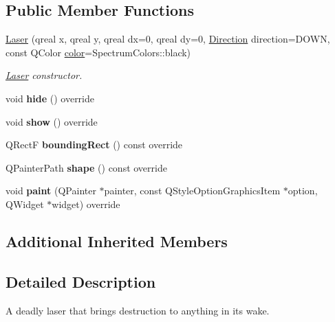 \subsection*{Public Member Functions}
\begin{DoxyCompactItemize}
\item 
\hyperlink{class_laser_a30b4f582099e3224f2735cd48e57a4c5}{Laser} (qreal x, qreal y, qreal dx=0, qreal dy=0, \hyperlink{class_laser_a449bd9d5f3f2c266239c0672a24d122e}{Direction} direction=D\+O\+WN, const Q\+Color \hyperlink{class_entity_ad14bf88ca550e2e5b13438a3faf545e6}{color}=Spectrum\+Colors\+::black)
\begin{DoxyCompactList}\small\item\em \hyperlink{class_laser}{Laser} constructor. \end{DoxyCompactList}\item 
\mbox{\label{class_laser_ab3b321f748b2bc57bbace69c82dfdce7}} 
void {\bfseries hide} () override
\item 
\mbox{\label{class_laser_a87e2856ea9fd9fd2050a8aff80274b55}} 
void {\bfseries show} () override
\item 
\mbox{\label{class_laser_aae435ce15a186fa1dc23892ceaa2fa20}} 
Q\+RectF {\bfseries bounding\+Rect} () const override
\item 
\mbox{\label{class_laser_afcb9f0aa269d428e60ff07b7b8a80a41}} 
Q\+Painter\+Path {\bfseries shape} () const override
\item 
\mbox{\label{class_laser_a495211025f8005bb4a8037979cebb0d5}} 
void {\bfseries paint} (Q\+Painter $\ast$painter, const Q\+Style\+Option\+Graphics\+Item $\ast$option, Q\+Widget $\ast$widget) override
\end{DoxyCompactItemize}
\subsection*{Additional Inherited Members}


\subsection{Detailed Description}
A deadly laser that brings destruction to anything in it\textquotesingle{}s wake. 

